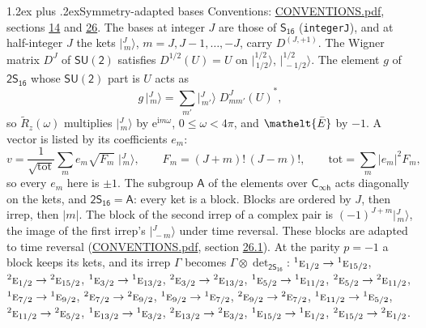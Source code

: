 \documentclass[10pt,a4paper]{article}
\makeatletter
\renewcommand\section{\@startsection{section}{1}{\z@}{-3ex plus -1ex minus -.2ex}%
  {1.2ex plus .2ex}{\normalfont\large\sffamily\bfseries\color{parttitle}}}
\numberwithin{equation}{section}
\newcommand{\eltfont}[1]{{\let\sigma\eltsigma\mathelt{#1}}}
\newcommand{\grp}[1]{\mathsf{#1}}
\newcommand{\irr}[1]{\text{\normalfont\scshape #1}}
\newcommand{\conjpair}[1]{{}^{#1}}
\newcommand{\elt}[1]{\eltfont{#1}}
\newcommand{\iunit}{\mathrm{i}}
\newcommand{\expe}{\mathrm{e}}
\newcommand{\irrJp}[2]{D^{(#1,#2)}}
\newcommand{\wignerD}[1]{D^{#1}}
\newcommand{\conj}[1]{{#1}^{*}}
\newcommand{\irrprod}{\otimes}
\newcommand{\jm}[2]{\bigl\lvert{}^{#1}_{\,#2}\bigr\rangle}
\newcommand{\barred}[1]{\bar{#1}}
\newcommand{\lift}[1]{\tilde{#1}}
\makeatother
\begin{document}
\section{Symmetry-adapted bases}\label{s:bases}
Conventions: \href{../../CONVENTIONS.pdf}{CONVENTIONS.pdf}, sections \href{../../../rotation/CONVENTIONS.pdf\#conv.14}{14} and \href{../../CONVENTIONS.pdf\#conv.26}{26}.
\leavevmode\label{n:index.m}\label{n:vector.ket}The bases at integer $J$ are those of \href{../../../rotation/data/pdf/S16.pdf}{$\grp{S_{16}}$} (\texttt{integerJ}), and at half-integer $J$ the kets $\jm{J}{m}$, $m = J, J-1, \dots, -J$, carry $\irrJp{J}{+1}$. \label{n:matrix.wigner}The Wigner matrix $\wignerD{J}$ of $\grp{SU(2)}$ satisfies $\wignerD{1/2}(U) = U$ on $\jm{1/2}{1/2}$, $\jm{1/2}{-1/2}$. The element $g$ of $\grp{2S_{16}}$ whose $\grp{SU(2)}$ part is $U$ acts as
\begin{equation}\label{e:action}g\,\jm{J}{m} = \sum_{m'} \jm{J}{m'}\; \conj{\wignerD{J}_{m m'}(U)},\end{equation}
so $\lift{R}_{z}(\omega)$ multiplies $\jm{J}{m}$ by $\expe^{\iunit m\omega}$, $0 \le \omega < 4\pi$, and $\elt{\barred{E}}$ by $-1$. \label{n:index.ketcoefficient}\label{n:vector.basis.symmetry}\label{n:index.ketweight}\label{n:index.total}A vector is listed by its coefficients $e_m$:
\begin{equation}\label{e:ket}v = \frac{1}{\sqrt{\mathrm{tot}}}\sum_m e_m\sqrt{F_m}\;\jm{J}{m},\qquad F_m = (J+m)!\,(J-m)!,\qquad \mathrm{tot} = \sum_m |e_m|^2F_m,\end{equation}
so every $e_m$ here is $\pm 1$.
\leavevmode\label{n:group.A}The subgroup $\grp{A}$ of the elements over $\grp{C_{\infty h}}$ acts diagonally on the kets, and $\grp{2S_{16}} = \grp{A}$: every ket is a block. Blocks are ordered by $J$, then irrep, then $|m|$. The block of the second irrep of a complex pair is $(-1)^{J+m}\jm{J}{m}$, the image of the first irrep's $\jm{J}{-m}$ under time reversal. These blocks are adapted to time reversal (\href{../../CONVENTIONS.pdf}{CONVENTIONS.pdf}, section \href{../../CONVENTIONS.pdf\#conv.26.1}{26.1}).
At the parity $p = -1$ a block keeps its kets, and its irrep $\Gamma$ becomes $\Gamma \irrprod \det_{\grp{2S_{16}}}$: $\conjpair{1}\irr{e}_{1/2} \to \conjpair{1}\irr{e}_{15/2}$, $\conjpair{2}\irr{e}_{1/2} \to \conjpair{2}\irr{e}_{15/2}$, $\conjpair{1}\irr{e}_{3/2} \to \conjpair{1}\irr{e}_{13/2}$, $\conjpair{2}\irr{e}_{3/2} \to \conjpair{2}\irr{e}_{13/2}$, $\conjpair{1}\irr{e}_{5/2} \to \conjpair{1}\irr{e}_{11/2}$, $\conjpair{2}\irr{e}_{5/2} \to \conjpair{2}\irr{e}_{11/2}$, $\conjpair{1}\irr{e}_{7/2} \to \conjpair{1}\irr{e}_{9/2}$, $\conjpair{2}\irr{e}_{7/2} \to \conjpair{2}\irr{e}_{9/2}$, $\conjpair{1}\irr{e}_{9/2} \to \conjpair{1}\irr{e}_{7/2}$, $\conjpair{2}\irr{e}_{9/2} \to \conjpair{2}\irr{e}_{7/2}$, $\conjpair{1}\irr{e}_{11/2} \to \conjpair{1}\irr{e}_{5/2}$, $\conjpair{2}\irr{e}_{11/2} \to \conjpair{2}\irr{e}_{5/2}$, $\conjpair{1}\irr{e}_{13/2} \to \conjpair{1}\irr{e}_{3/2}$, $\conjpair{2}\irr{e}_{13/2} \to \conjpair{2}\irr{e}_{3/2}$, $\conjpair{1}\irr{e}_{15/2} \to \conjpair{1}\irr{e}_{1/2}$, $\conjpair{2}\irr{e}_{15/2} \to \conjpair{2}\irr{e}_{1/2}$.
\end{document}

